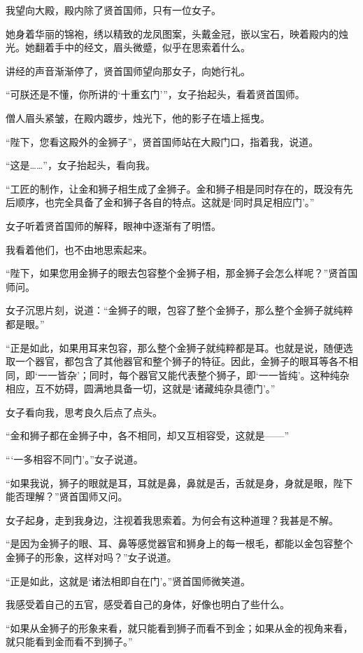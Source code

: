 \documentclass[UTF8,openany]{ctexbook}
\begin{document}
我望向大殿，殿内除了贤首国师，只有一位女子。

她身着华丽的锦袍，绣以精致的龙凤图案，头戴金冠，嵌以宝石，映着殿内的烛光。她翻着手中的经文，眉头微蹙，似乎在思索着什么。

讲经的声音渐渐停了，贤首国师望向那女子，向她行礼。

“可朕还是不懂，你所讲的‘十重玄门’”，女子抬起头，看着贤首国师。

僧人眉头紧皱，在殿内踱步，烛光下，他的影子在墙上摇曳。

“陛下，您看这殿外的金狮子”，贤首国师站在大殿门口，指着我，说道。

“这是……”，女子抬起头，看向我。

“工匠的制作，让金和狮子相生成了金狮子。金和狮子相是同时存在的，既没有先后顺序，也完全具备了金和狮子各自的特点。这就是‘同时具足相应门’\cite{bi:hy}。”

女子听着贤首国师的解释，眼神中逐渐有了明悟。

我看着他们，也不由地思索起来。

“陛下，如果您用金狮子的眼去包容整个金狮子相，那金狮子会怎么样呢？”贤首国师问。

女子沉思片刻，说道：“金狮子的眼，包容了整个金狮子，那么整个金狮子就纯粹都是眼。”

“正是如此，如果用耳来包容，那么整个金狮子就纯粹都是耳。也就是说，随便选取一个器官，都包含了其他器官和整个狮子的特征。因此，金狮子的眼耳等各不相同，即‘一一皆杂’；同时，每个器官又能代表整个狮子，即‘一一皆纯’。这种纯杂相应，互不妨碍，圆满地具备一切，这就是‘诸藏纯杂具德门’\cite{bi:hy}。”

女子看向我，思考良久后点了点头。

“金和狮子都在金狮子中，各不相同，却又互相容受\cite{bi:hy}，这就是——”

“‘一多相容不同门’。”女子说道。

“如果我说，狮子的眼就是耳，耳就是鼻，鼻就是舌，舌就是身，身就是眼\cite{bi:hy}，陛下能否理解？”贤首国师又问。

女子起身，走到我身边，注视着我思索着。为何会有这种道理？我甚是不解。

“是因为金狮子的眼、耳、鼻等感觉器官和狮身上的每一根毛，都能以金包容整个金狮子的形象，这样对吗？”女子说道。

“正是如此，这就是‘诸法相即自在门’。”贤首国师微笑道。

我感受着自己的五官，感受着自己的身体，好像也明白了些什么。

“如果从金狮子的形象来看，就只能看到狮子而看不到金；如果从金的视角来看，就只能看到金而看不到狮子\cite{bi:hy}。”
\end{document}

